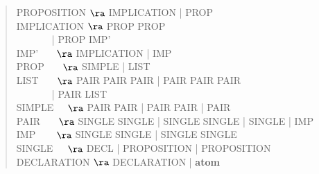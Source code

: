 \begin{quote}
\ttfamily
PROPOSITION $\ra$ IMPLICATION | PROP\\
IMPLICATION $\ra$  PROP  PROP\\
\(~~~~~~~~~~~~~~~\) |
 PROP  IMP'\\
IMP' \(~~~~~~~\)$\ra$ IMPLICATION | IMP \\
PROP \(~~~~~~~\)$\ra$ SIMPLE | LIST \\
LIST \(~~~~~~~\)$\ra$ PAIR\txt{, } PAIR PAIR |
                      PAIR\txt{, } PAIR PAIR\\
\(~~~~~~~~~~~~~~~\) | PAIR\txt{, } LIST\\
SIMPLE \(~~~~~\)$\ra$ PAIR  PAIR |
                      PAIR  PAIR  | PAIR\\
PAIR \(~~~~~~~\)$\ra$ SINGLE   SINGLE | SINGLE  SINGLE
                    | SINGLE | IMP\\
IMP \(~~~~~~~~\)$\ra$ SINGLE  SINGLE
                    | SINGLE  SINGLE\\
SINGLE \(~~~~~\)$\ra$ DECL | PROPOSITION |
                      PROPOSITION\\
DECLARATION $\ra$ DECLARATION | \bf{atom}\\
\end{quote}
